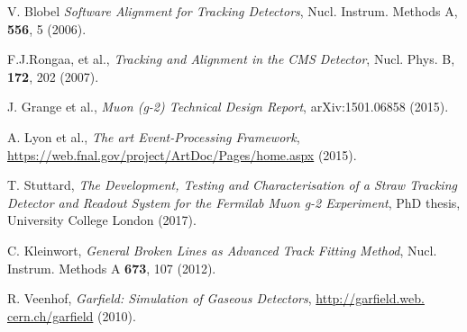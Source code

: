 \begin{thebibliography}{100}

 V. Blobel \textit{Software Alignment for Tracking Detectors}, Nucl. Instrum. Methods A, \textbf{556}, 5 (2006).

 F.J.Rongaa, et al., \textit{Tracking and Alignment in the CMS Detector}, Nucl. Phys. B, \textbf{172}, 202 (2007).

 J. Grange et al., \textit{Muon (g-2) Technical Design Report}, arXiv:1501.06858 (2015).

 A. Lyon et al., \textit{The art Event-Processing Framework}, \url{https://web.fnal.gov/project/ArtDoc/Pages/home.aspx} (2015).

 T. Stuttard, \textit{The Development, Testing and Characterisation of a Straw Tracking Detector and Readout System for the Fermilab Muon g-2 Experiment}, PhD thesis, University College London (2017).

 C. Kleinwort, \textit{General Broken Lines as Advanced Track Fitting Method}, Nucl. Instrum. Methods A \textbf{673}, 107 (2012).

 R. Veenhof, \textit{Garfield: Simulation of Gaseous Detectors}, \url{http://garfield.web. cern.ch/garfield} (2010).


\end{thebibliography}

\newpage{\pagestyle{empty}\cleardoublepage}